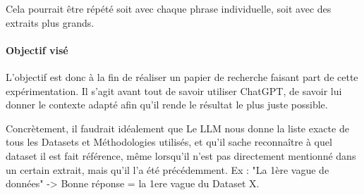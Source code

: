 Cela pourrait être répété soit avec chaque phrase individuelle, soit avec des extraits plus grands.


\paragraph{Objectif visé}

L'objectif est donc à la fin de réaliser un papier de recherche faisant part de cette expérimentation.
Il s'agit avant tout de savoir utiliser ChatGPT, de savoir lui donner le contexte adapté afin qu'il rende le résultat le plus juste possible.

Concrètement, il faudrait idéalement que Le LLM nous donne la liste exacte de tous les Datasets et Méthodologies utilisés, et qu'il sache reconnaître à quel dataset il est fait référence, même lorsqu'il n'est pas directement mentionné dans un certain extrait, mais qu'il l'a été précédemment.
Ex : "La 1ère vague de données" -> Bonne réponse = la 1ere vague du Dataset X.